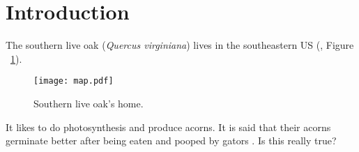 \documentclass[../main.tex]{article}
\begin{document}
\section{Introduction}

The southern live oak (\textit{Quercus virginiana}) lives in the southeastern US (\textcite{Cavender-Bares2015}, Figure ~\ref{fig:map}).

\begin{figure}[ht!]
\texttt{[image: map.pdf]}
\centering	
\caption{Southern live oak's home.}
\label{fig:map}
\end{figure}

It likes to do photosynthesis and produce acorns. It is said that their acorns germinate better after being eaten and pooped by gators \parencite{CavenderBares2027}. Is this really true?
\end{document}
